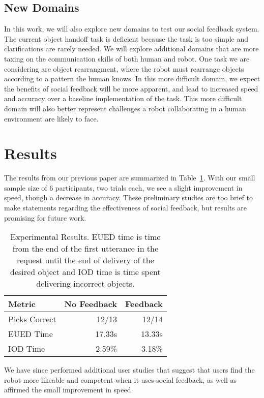 \documentclass{article}
\begin{document}
\subsection{New Domains}

In this work, we will also explore new domains to test our social feedback system. The current object handoff task is deficient because the task is too simple and clarifications are rarely needed. We will explore additional domains that are more taxing on the communication skills of both human and robot. One task we are considering are object rearrangment, where the robot must rearrange objects according to a pattern the human knows. In this more difficult domain, we expect the benefits of social feedback will be more apparent, and lead to increased speed and accuracy over a baseline implementation of the task. This more difficult domain will also better represent challenges a robot collaborating in a human environment are likely to face. 

\section{Results}

The results from our previous paper are summarized in Table~\ref{table:expResults}. With our small sample size of 6 participants, two trials each, we see a slight improvement in speed, though a decrease in accuracy. These preliminary studies are too brief to make statements regarding the effectiveness of social feedback, but results are promising for future work. 

\begin{table}
\begin{center}
\begin{tabular}{lrr}
\hline
Metric & No Feedback & Feedback \\
\hline
Picks Correct & 12/13 & 12/14\\
EUED Time & 17.33s & 13.33s\\
IOD Time & 2.59\% & 3.18\%\\
\hline
\end{tabular}
\caption{\label{table:expResults} Experimental Results. EUED time is time from
the end of the first utterance in the request until the end of delivery of the
desired object and IOD time is time spent delivering incorrect objects.}
\end{center}
\end{table}

We have since performed additional user studies that suggest that users find the robot more likeable and competent when it uses social feedback, as well as affirmed the small improvement in speed. 
\end{document}
